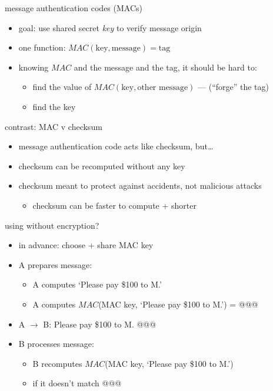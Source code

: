 \begin{frame}{message authentication codes (MACs)}
    \begin{itemize}
    \item goal: use shared secret \textit{key} to verify message origin
    \vspace{.5cm}
    \item one function: $MAC(\text{key}, \text{message}) = \text{tag}$
    \item knowing $MAC$ and the message and the tag, it should be hard to:
        \begin{itemize}
        \item find the value of $MAC(\text{key}, \text{other message})$ --- (``forge'' the tag)
        \item find the key
        \end{itemize}
    \end{itemize}
\end{frame}

\begin{frame}{contrast: MAC v checksum}
    \begin{itemize}
    \item message authentication code acts like checksum, but\ldots
    \vspace{.5cm}
    \item checksum can be recomputed without any key
    \item checksum meant to protect against accidents, not malicious attacks
        \begin{itemize}
        \item checksum can be faster to compute + shorter
        \end{itemize}
    \end{itemize}
\end{frame}

\begin{frame}{using without encryption?}
    \begin{itemize}
    \item in advance: choose + share MAC key
    \vspace{.5cm}
    \item A prepares message:
    \begin{itemize}
    \item A computes `Please pay \$100 to M.'
    \item A computes $MAC$(MAC key, `Please pay \$100 to M.') = @@@
    \end{itemize}
    \item A $\rightarrow$ B: Please pay \$100 to M. @@@
    \item<2-> B processes message:
    \begin{itemize}
        \item B recomputes $MAC$(MAC key, `Please pay \$100 to M.')
        \item {} if it doesn't match @@@
    \end{itemize}
    \end{itemize}
\end{frame}

